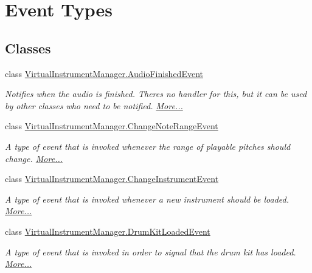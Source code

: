 \hypertarget{group___v_i_m_event_types}{}\section{Event Types}
\label{group___v_i_m_event_types}
\subsection*{Classes}
\begin{DoxyCompactItemize}
\item 
class \hyperlink{group___v_i_m_event_types_class_virtual_instrument_manager_1_1_audio_finished_event}{Virtual\+Instrument\+Manager.\+Audio\+Finished\+Event}
\begin{DoxyCompactList}\small\item\em Notifies when the audio is finished. There\textquotesingle{}s no handler for this, but it can be used by other classes who need to be notified.  \hyperlink{group___v_i_m_event_types_class_virtual_instrument_manager_1_1_audio_finished_event}{More...}\end{DoxyCompactList}\item 
class \hyperlink{group___v_i_m_event_types_class_virtual_instrument_manager_1_1_change_note_range_event}{Virtual\+Instrument\+Manager.\+Change\+Note\+Range\+Event}
\begin{DoxyCompactList}\small\item\em A type of event that is invoked whenever the range of playable pitches should change.  \hyperlink{group___v_i_m_event_types_class_virtual_instrument_manager_1_1_change_note_range_event}{More...}\end{DoxyCompactList}\item 
class \hyperlink{group___v_i_m_event_types_class_virtual_instrument_manager_1_1_change_instrument_event}{Virtual\+Instrument\+Manager.\+Change\+Instrument\+Event}
\begin{DoxyCompactList}\small\item\em A type of event that is invoked whenever a new instrument should be loaded.  \hyperlink{group___v_i_m_event_types_class_virtual_instrument_manager_1_1_change_instrument_event}{More...}\end{DoxyCompactList}\item 
class \hyperlink{group___v_i_m_event_types_class_virtual_instrument_manager_1_1_drum_kit_loaded_event}{Virtual\+Instrument\+Manager.\+Drum\+Kit\+Loaded\+Event}
\begin{DoxyCompactList}\small\item\em A type of event that is invoked in order to signal that the drum kit has loaded.  \hyperlink{group___v_i_m_event_types_class_virtual_instrument_manager_1_1_drum_kit_loaded_event}{More...}\end{DoxyCompactList}\item 

\end{DoxyCompactItemize}
